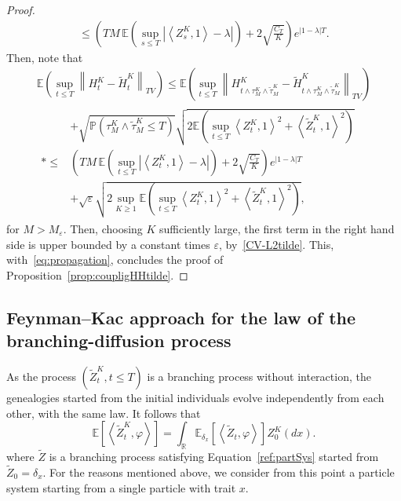 \documentclass[10pt]{amsart}
\theoremstyle{definition}\newtheorem{defi}[theo]{Definition}\newtheorem{rema}[theo]{Remark}\newtheorem{exam}[theo]{Example}\newtheorem{exem}[theo]{Example}\newtheorem{nota}[theo]{Notation}
\renewcommand*\P{\mathbb{P}}
\newcommand*\R{\mathbb{R}}
\newcommand*\E{\mathbb{E}}
\begin{document}
\begin{proof}
\begin{multline*}
\leq \left(TM\, \E\left(\sup_{s \leq T} \left|\left\langle Z^K_s,1\right\rangle- \lambda \right|\right)+ 2 \sqrt{\frac{C_T }{K}} \right) e^{|1-\lambda| T}.
\end{multline*}
\endgroup
Then, note that
\begingroup
\allowdisplaybreaks
\begin{multline}
\E\left(\sup_{t \leq T}\left\| H^{K}_{t}-\widetilde{H}^{K}_{t} \right\|_{TV}\right)\leq\E\left(\sup_{t \leq T}\left\| H^{K}_{t \wedge \tau^K_M \wedge \widetilde{\tau}^K_M}-\widetilde{H}^{K}_{t \wedge \tau^K_M \wedge  \widetilde{\tau}^K_M}\right\|_{TV}\right) \\
\begin{aligned}
& + \sqrt{\P\left(\tau^K_M \wedge \widetilde{\tau}^K_M\leq T\right)} \sqrt{2 \E\left(\sup_{t \leq T}\left\langle Z^K_t,1\right\rangle^2 + \left\langle \widetilde{Z}^K_t,1\right\rangle^2\right)}\\*
\leq & \left(TM\, \E\left(\sup_{t \leq T} \left|\left\langle Z^K_t,1\right\rangle- \lambda \right|\right)+ 2 \sqrt{\frac{C_T }{K}} \right) e^{|1-\lambda| T}\\
&+\sqrt{\varepsilon} \sqrt{2 \sup_{K \geq 1}\E\left(\sup_{t \leq T}\left\langle Z^K_t,1\right\rangle^2 + \left\langle \widetilde{Z}^K_t,1\right\rangle^2\right)},
\end{aligned}
\end{multline}
\endgroup
for $M>M_\varepsilon$. Then, choosing $K$ sufficiently large, the first term in the right hand side is upper bounded by a constant times $\varepsilon$, by~\eqref{CV-L2tilde}. This, with~\eqref{eq:propagation}, concludes the proof of Proposition~\ref{prop:coupligHHtilde}.
\end{proof}



\subsection{Feynman--Kac approach for the law of the branching-diffusion process}

As the process $(\widetilde{Z}^{K}_{t},t\le T)$ is a branching process without interaction, the genealogies started from the initial individuals evolve independently from each other, with the same law. It follows that
\[
\E\left[\left\langle \widetilde{Z}_{t}^{K},\varphi\right\rangle\right]=\int_{\R} \E_{\delta_x}\left[\left\langle \widetilde{Z}_{t},\varphi\right\rangle \right] {Z}^{K}_{0}(dx).
\]
where $\widetilde{Z}$ is a branching process satisfying Equation~\eqref{ref:partSys} started from $\widetilde{Z}_{0}=\delta_{x}$. For the reasons mentioned above, we consider from this point a particle system starting from a single particle with trait $x$.
\end{document}
